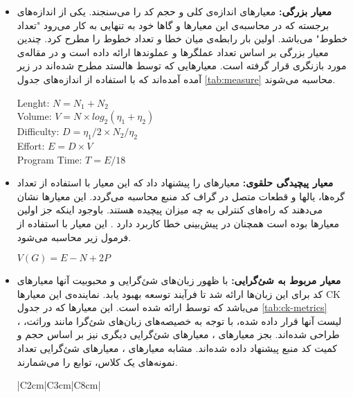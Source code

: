 \begin{itemize}
	\item \textbf{معیار بزرگی: }
معیارهای  اندازه‌ی کلی و حجم کد را می‌سنجند. یکی از اندازه‌های برجسته که در محاسبه‌ی این معیارها و گاها خود به تنهایی به کار می‌رود "تعداد خطوط" می‌باشد. اولین بار 
 \cite{akiyama1971example}  
رابطه‌ی میان خطا و تعداد خطوط را مطرح کرد. 
 \cite{halstead1977elements} 
 چندین معیار بزرگی بر اساس  تعداد عملگرها و عملوند‌ها ارائه داده است و در مقاله‌ی \cite{pawade2016exploring} مورد بازنگری قرار گرفته است. معیارهایی که توسط هالستد مطرح شده‌اند در زیر آمده آمده‌اند که با استفاده از اندازه‌های جدول \ref{tab:measure} محاسبه می‌شوند. 
 \begin{latin}
 \baselineskip=1.1cm
Lenght: $N = N_1 + N_2$ \\
Volume: $V = N \times log_2 (\eta_1 + \eta_2)$\\
Difficulty: $D = \eta_1/2 \times N_2/\eta_2$ \\
Effort: $E = D \times V$ \\
Program Time: $T = E/18$ \\
 \end{latin}
 
 
\item \textbf{معیار پیچیدگی حلقوی: }
 معیارهای 
را پیشنهاد داد که این معیار با استفاده از تعداد گره‌ها، یالها و قطعات متصل در گراف   کد منبع محاسبه می‌گردد\cite{mccabe1976complexity}. این معیارها نشان می‌دهند که راه‌های کنترلی به چه میزان پیچیده هستند. باوجود اینکه جز اولین معیارها بوده است همچنان در پیش‌بینی خطا کاربرد دارد \cite{malhotra2014comparative}. این معیار  با استفاده از فرمول زیر محاسبه می‌شود. \\
\begin{latin}
$V(G) = E - N + 2P $
\end{latin}


\item \textbf{معیار مربوط به شئ‌گرایی: }
با ظهور زبان‌های شئ‌گرایی و محبوبیت آنها معیارهای کد  برای این زبان‌ها ارائه شد تا فرآیند توسعه بهبود یابد. نماینده‌ی این معیارها CK می‌باشد که توسط 
 ارائه شده است\cite{chidamber1994metrics}. این معیارها  که در جدول  \ref{tab:ck-metrics} لیست آنها قرار داده شده، با توجه به خصیصه‌های زبان‌های شئ‌گرا مانند وراثت، ،  طراحی شده‌اند. بجز معیارهای  ، معیارهای شئ‌گرایی دیگری نیز بر اساس حجم و کمیت کد منبع پیشنهاد داده شده‌اند. مشابه معیارهای ، معیارهای شئ‌گرایی تعداد نمونه‌های یک کلاس، توابع را می‌شمارند. \\
 \begin{table}[H] 
 	\renewcommand*{\arraystretch}{1.5}	
 	\centering \caption{معیارهای CK }
 	\label{tab:ck-metrics}
 	\begin{tabular}{|C{2cm}|C{3cm}|C{8cm}|}
 		

\end{tabular}
\end{table}
\end{itemize}
